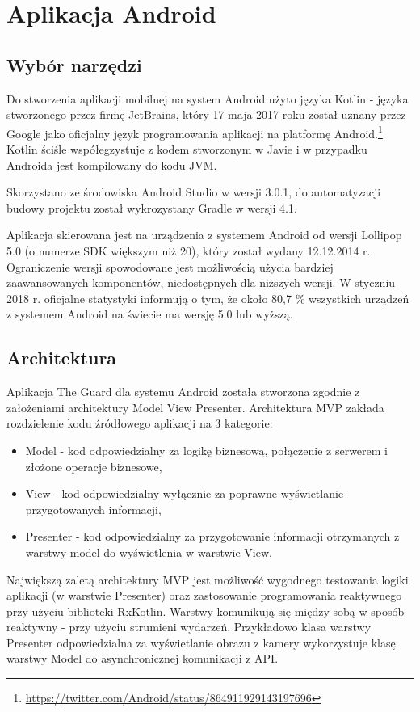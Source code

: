 \section{Aplikacja Android}
\subsection{Wybór narzędzi}
Do stworzenia aplikacji mobilnej na system Android użyto języka Kotlin - języka stworzonego przez firmę JetBrains, który 17 maja 2017 roku został uznany przez Google jako oficjalny język programowania aplikacji na platformę Android.\footnote{\url{https://twitter.com/Android/status/864911929143197696}}
Kotlin ściśle współegzystuje z kodem stworzonym w Javie i w przypadku Androida jest kompilowany do kodu JVM.\cite{KOTLIN}

Skorzystano ze środowiska Android Studio w wersji 3.0.1, do automatyzacji budowy projektu został wykrozystany Gradle w wersji 4.1.

Aplikacja skierowana jest na urządzenia z systemem Android od wersji Lollipop 5.0 (o numerze SDK większym niż 20), który został wydany 12.12.2014 r. Ograniczenie wersji spowodowane jest możliwością użycia bardziej zaawansowanych komponentów, niedostępnych dla niższych wersji. W styczniu 2018 r. oficjalne statystyki informują o tym, że około 80,7 \% wszystkich urządzeń z systemem Android na świecie ma wersję 5.0 lub wyższą. \cite{android}

\subsection{Architektura}
Aplikacja The Guard dla systemu Android została stworzona zgodnie z założeniami architektury Model View Presenter.
Architektura MVP zakłada rozdzielenie kodu źródłowego aplikacji na 3 kategorie:
\begin{itemize}
\item Model - kod odpowiedzialny za logikę biznesową, połączenie z serwerem i złożone operacje biznesowe,
\item View - kod odpowiedzialny wyłącznie za poprawne wyświetlanie przygotowanych informacji,
\item Presenter - kod odpowiedzialny za przygotowanie informacji otrzymanych z warstwy model do wyświetlenia w warstwie View.
\end{itemize}
Największą zaletą architektury MVP jest możliwość wygodnego testowania logiki aplikacji (w warstwie Presenter) oraz zastosowanie programowania reaktywnego przy użyciu biblioteki RxKotlin.
Warstwy komunikują się między sobą w sposób reaktywny - przy użyciu strumieni wydarzeń.
Przykładowo klasa warstwy Presenter odpowiedzialna za wyświetlanie obrazu z kamery wykorzystuje klasę warstwy Model do asynchronicznej komunikacji z API. \cite{RXJAVA}

